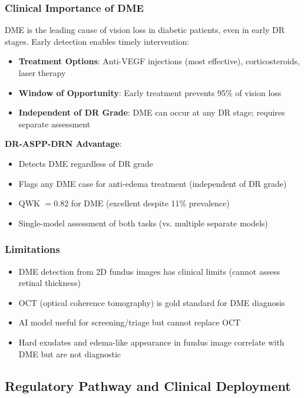 \documentclass[12pt,a4paper]{article}
\begin{document}
\subsubsection{Clinical Importance of DME}

DME is the leading cause of vision loss in diabetic patients, even in early DR stages. Early detection enables timely intervention:

\begin{itemize}
    \item \textbf{Treatment Options}: Anti-VEGF injections (most effective), corticosteroids, laser therapy
    \item \textbf{Window of Opportunity}: Early treatment prevents 95\% of vision loss
    \item \textbf{Independent of DR Grade}: DME can occur at any DR stage; requires separate assessment
\end{itemize}

\textbf{DR-ASPP-DRN Advantage}:

\begin{itemize}
    \item Detects DME regardless of DR grade
    \item Flags any DME case for anti-edema treatment (independent of DR grade)
    \item QWK $= 0.82$ for DME (excellent despite 11\% prevalence)
    \item Single-model assessment of both tasks (vs. multiple separate models)
\end{itemize}

\subsubsection{Limitations}

\begin{itemize}
    \item DME detection from 2D fundus images has clinical limits (cannot assess retinal thickness)
    \item OCT (optical coherence tomography) is gold standard for DME diagnosis
    \item AI model useful for screening/triage but cannot replace OCT
    \item Hard exudates and edema-like appearance in fundus image correlate with DME but are not diagnostic
\end{itemize}

\subsection{Regulatory Pathway and Clinical Deployment}
\end{document}
